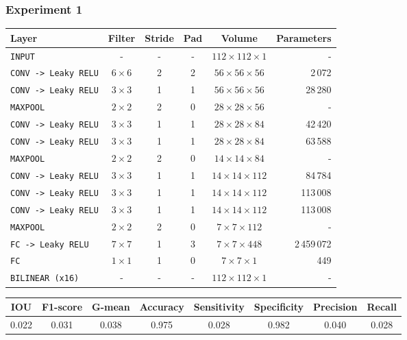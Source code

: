 \documentclass{beamer}
\begin{document}
	\begin{frame}
		\frametitle{Experiment 1}
		\footnotesize
		\begin{table}[h]
			\centering
			\begin{tabular}{lccccr}
			\hline
			\textbf{Layer} & \textbf{Filter} & \textbf{Stride} &\textbf{Pad} & \textbf{Volume} & \textbf{Parameters} \\
			\hline
			\texttt{INPUT}	& -	& - & - & $112 \times 112 \times 1$ & -\\
			\texttt{CONV -> Leaky RELU} & $6 \times 6$ & 2 & 2 & $56 \times 56 \times 56$ & 2\,072\\
			\texttt{CONV -> Leaky RELU} & $3 \times 3$ & 1 & 1 & $56 \times 56 \times 56$ & 28\,280\\
			\texttt{MAXPOOL} & $2 \times 2$ & 2 & 0 & $28 \times 28 \times 56$ & -\\
			\texttt{CONV -> Leaky RELU} & $3 \times 3$ & 1 & 1 & $28 \times 28 \times 84$ & 42\,420\\
			\texttt{CONV -> Leaky RELU} & $3 \times 3$ & 1 & 1 & $28 \times 28 \times 84$ & 63\,588\\
			\texttt{MAXPOOL} & $2 \times 2$ & 2 & 0 & $14 \times 14 \times 84$ & -\\
			\texttt{CONV -> Leaky RELU} & $3 \times 3$ & 1 & 1 & $14 \times 14 \times 112$ & 84\,784\\
			\texttt{CONV -> Leaky RELU} & $3 \times 3$ & 1 & 1 & $14 \times 14 \times 112$ & 113\,008\\
			\texttt{CONV -> Leaky RELU} & $3 \times 3$ & 1 & 1 & $14 \times 14 \times 112$ & 113\,008\\
			\texttt{MAXPOOL} & $2 \times 2$ & 2 & 0 & $7 \times 7 \times 112$ & -\\
			\texttt{FC -> Leaky RELU} & $7 \times 7$ & 1 & 3 & $7 \times 7 \times 448$ & 2\,459\,072\\
			\texttt{FC} & $1 \times 1$ & 1 & 0 & $7 \times 7 \times 1$ & 449 \\
			\texttt{BILINEAR (x16)} & - & - & - & $112 \times 112 \times 1$ & -\\
			\hline
			\end{tabular}
		\end{table}
		
		\scriptsize
		\begin{table}[h]
			\centering
			\begin{tabular}{cccccccc}
			\hline
			\textbf{IOU}	& \textbf{F1-score}	& \textbf{G-mean} &\textbf{Accuracy}	& \textbf{Sensitivity} & \textbf{Specificity} & \textbf{Precision} & \textbf{Recall}\\
			\hline
			0.022 & 0.031 & 0.038 & 0.975 & 0.028 & 0.982 & 0.040 & 0.028\\
			\hline
			\end{tabular}
		\end{table}

	\end{frame}
	
\end{document}
